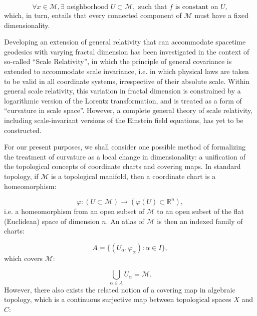 \documentclass{article}
\begin{document}
\begin{equation}
\forall x \in \mathcal{M}, \exists \text{ neighborhood } U \subset \mathcal{M}, \text{ such that } f \text{ is constant on } U,
\end{equation}
which, in turn, entails that every connected component of ${\mathcal{M}}$ must have a fixed dimensionality.

Developing an extension of general relativity that can accommodate spacetime geodesics with varying fractal dimension has been investigated in the context of so-called ``Scale Relativity''\cite{nottale}\cite{ord}\cite{nottale2}, in which the principle of general covariance is extended to accommodate scale invariance, i.e. in which physical laws are taken to be valid in all coordinate systems, irrespective of their absolute scale. Within general scale relativity, this variation in fractal dimension is constrained by a logarithmic version of the Lorentz transformation, and is treated as a form of ``curvature in scale space''. However, a complete general theory of scale relativity, including scale-invariant versions of the Einstein field equations, has yet to be constructed.

For our present purposes, we shall consider one possible method of formalizing the treatment of curvature as a local change in dimensionality: a unification of the topological concepts of coordinate charts and covering maps. In standard topology, if ${\mathcal{M}}$ is a topological manifold, then a coordinate chart is a homeomorphism\cite{jost}\cite{lee2}:

\begin{equation}
\varphi : \left( U \subset \mathcal{M} \right) \to \left( \varphi \left( U \right) \subset \mathbb{R}^n \right),
\end{equation}
i.e. a homeomorphism from an open subset of ${\mathcal{M}}$ to an open subset of the flat (Euclidean) space of dimension $n$. An atlas of ${\mathcal{M}}$ is then an indexed family of charts:

\begin{equation}
A = \lbrace \left( U_{\alpha}, \varphi_{\alpha} \right) : \alpha \in I \rbrace,
\end{equation}
which covers ${\mathcal{M}}$:

\begin{equation}
\bigcup_{\alpha \in A} U_{\alpha} = \mathcal{M}.
\end{equation}
However, there also exists the related notion of a covering map in algebraic topology, which is a continuous surjective map between topological spaces $X$ and $C$\cite{spanier}\cite{chernavskii}:
\end{document}
